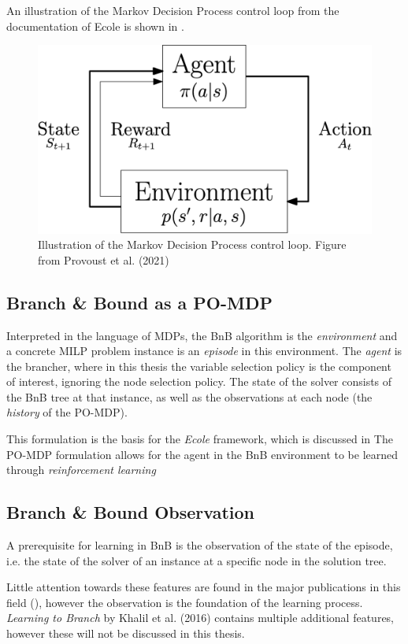 An illustration of the Markov Decision Process control loop from the documentation of \gls{Ecole} is shown in .

\begin{figure}
    \centering
    \includegraphics[width=0.55\linewidth]{img/mdp.png}
    \caption{Illustration of the Markov Decision Process control loop. Figure from Provoust et al. (2021) \cite{prouvost2021ecole}}
    \label{fig:mdp}
\end{figure}

\subsection{Branch \& Bound as a PO-MDP}\label{ssec:pomdp}

Interpreted in the language of \gls{MDP}s, the \gls{BnB} algorithm is the \textit{environment} and a concrete \gls{MILP} problem instance is an \textit{episode} in this environment. The \textit{agent} is the brancher, where in this thesis the variable selection policy is the component of interest, ignoring the node selection policy. The state of the solver consists of the \gls{BnB} tree at that instance, as well as the observations at each node (the \textit{history} of the \gls{PO-MDP}).

This formulation is the basis for the \textit{Ecole} framework, which is discussed in 
The \gls{PO-MDP} formulation allows for the agent in the \gls{BnB} environment to be learned through \textit{reinforcement learning}


\subsection{Branch \& Bound Observation}\label{ssec:obs}

A prerequisite for learning in \gls{BnB} is the observation of the state of the episode, i.e. the state of the solver of an instance at a specific node in the solution tree. 

Little attention towards these features are found in the major publications in this field (\cite{gasse2019exact,gupta2020hybrid}), however the observation is the foundation of the learning process.
\textit{Learning to Branch} by Khalil et al. (2016) \cite{khalil2016learning} contains multiple additional features, however these will not be discussed in this thesis. 

